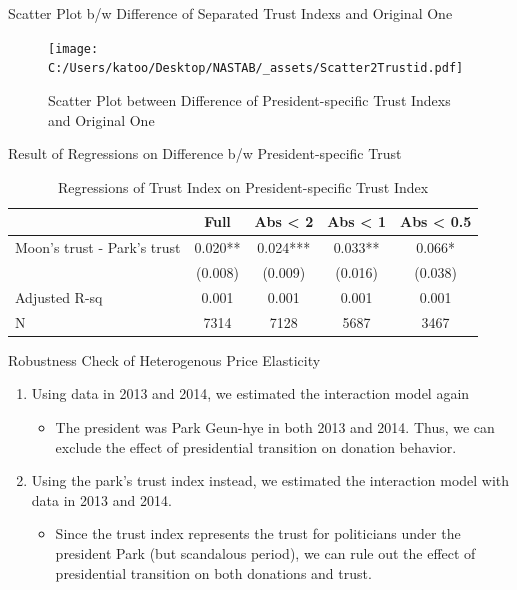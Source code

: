 \documentclass[
  ignorenonframetext,
]{beamer}
\providecommand{\tightlist}{%
  \setlength{\itemsep}{0pt}\setlength{\parskip}{0pt}}
\begin{document}
\begin{frame}{Scatter Plot b/w Difference of Separated Trust Indexs and Original One}
\protect\hypertarget{scatter-plot-bw-difference-of-separated-trust-indexs-and-original-one}{}
\begin{figure}
\centering
\texttt{[image: C:/Users/katoo/Desktop/NASTAB/\_assets/Scatter2Trustid.pdf]}
\caption{\label{fig:unnamed-chunk-7}Scatter Plot between Difference of President-specific Trust Indexs and Original One}
\end{figure}
\end{frame}

\begin{frame}{Result of Regressions on Difference b/w President-specific Trust}
\protect\hypertarget{result-of-regressions-on-difference-bw-president-specific-trust}{}
\begin{table}

\caption{\label{tab:kableRegTrustidOnDiff2Trustid}Regressions of Trust Index on President-specific Trust Index}
\centering
\fontsize{9}{11}\selectfont
\begin{tabular}[t]{lcccc}
\toprule
 & Full & Abs < 2 & Abs < 1 & Abs < 0.5\\
\midrule
Moon's trust - Park's trust & 0.020** & 0.024*** & 0.033** & 0.066*\\
 & (0.008) & (0.009) & (0.016) & (0.038)\\
Adjusted R-sq & 0.001 & 0.001 & 0.001 & 0.001\\
N & 7314 & 7128 & 5687 & 3467\\
\bottomrule
\end{tabular}
\end{table}
\end{frame}

\begin{frame}{Robustness Check of Heterogenous Price Elasticity}
\protect\hypertarget{robustness-check-of-heterogenous-price-elasticity}{}
\begin{enumerate}
\tightlist
\item
  Using data in 2013 and 2014, we estimated the interaction model again

  \begin{itemize}
  \tightlist
  \item
    The president was Park Geun-hye in both 2013 and 2014. Thus, we can exclude the effect of presidential transition on donation behavior.
  \end{itemize}
\item
  Using the park's trust index instead, we estimated the interaction model with data in 2013 and 2014.

  \begin{itemize}
  \tightlist
  \item
    Since the trust index represents the trust for politicians under the president Park (but scandalous period), we can rule out the effect of presidential transition on both donations and trust.
  \end{itemize}
\end{enumerate}
\end{frame}
\end{document}
